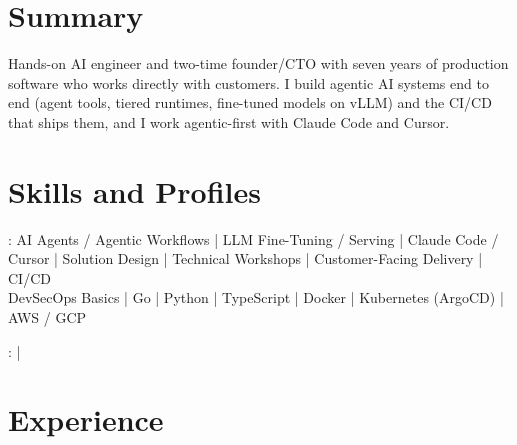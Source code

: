 \documentclass[print]{jack-resume}
\begin{document}
\pagecolor{darkmodeBackground}


\begin{minipage}[t][1cm][t]{.03\textwidth}
    \hfill
\end{minipage}

\section{Summary}
Hands-on AI engineer and two-time founder/CTO with seven years of production software who works directly with customers. I build agentic AI systems end to end (agent tools, tiered runtimes, fine-tuned models on vLLM) and the CI/CD that ships them, and I work agentic-first with Claude Code and Cursor.
\sectionsep

\section{Skills and Profiles}
:
AI Agents / Agentic Workflows \hfill | \hfill
LLM Fine-Tuning / Serving \hfill | \hfill
Claude Code / Cursor \hfill | \hfill
Solution Design \hfill | \hfill
Technical Workshops \hfill | \hfill
Customer-Facing Delivery \hfill | \hfill
CI/CD \\
\hspace{1.0cm} DevSecOps Basics \hfill | \hfill
Go \hfill | \hfill
Python \hfill | \hfill
TypeScript \hfill | \hfill
Docker \hfill | \hfill
Kubernetes (ArgoCD) \hfill | \hfill
AWS / GCP \\

\raggedright{
    :
      \href{https://www.linkedin.com/in/jack-sturtevant/}{ \ExternalLink} |
     \href{https://github.com/jacksturt}{ \ExternalLink}}

\section{Experience}
\end{document}
